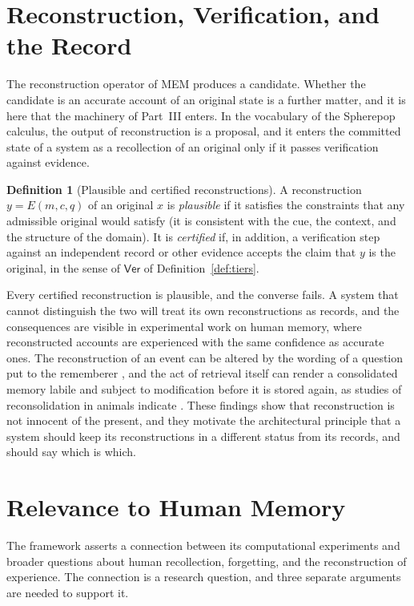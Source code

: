 \documentclass[11pt,twoside,openright]{book}
\theoremstyle{plain}
\theoremstyle{definition}
\newtheorem{definition}[theorem]{Definition}
\theoremstyle{remark}
\newcommand{\Ver}{\mathsf{Ver}}
\newcommand{\memeight}{\mbox{MEM\textbar 8}}
\begin{document}
\section{Reconstruction, Verification, and the Record}

The reconstruction operator of \memeight{} produces a candidate. Whether the candidate is an accurate account of an original state is a further matter, and it is here that the machinery of Part~III enters. In the vocabulary of the Spherepop calculus, the output of reconstruction is a proposal, and it enters the committed state of a system as a recollection of an original only if it passes verification against evidence.

\begin{definition}[Plausible and certified reconstructions]\label{def:certified}
A reconstruction $y=E(m,c,q)$ of an original $x$ is \emph{plausible} if it satisfies the constraints that any admissible original would satisfy (it is consistent with the cue, the context, and the structure of the domain). It is \emph{certified} if, in addition, a verification step against an independent record or other evidence accepts the claim that $y$ is the original, in the sense of $\Ver$ of Definition~\ref{def:tiers}.
\end{definition}

Every certified reconstruction is plausible, and the converse fails. A system that cannot distinguish the two will treat its own reconstructions as records, and the consequences are visible in experimental work on human memory, where reconstructed accounts are experienced with the same confidence as accurate ones. The reconstruction of an event can be altered by the wording of a question put to the rememberer \cite{loftus1974}, and the act of retrieval itself can render a consolidated memory labile and subject to modification before it is stored again, as studies of reconsolidation in animals indicate \cite{nader2000}. These findings show that reconstruction is not innocent of the present, and they motivate the architectural principle that a system should keep its reconstructions in a different status from its records, and should say which is which.

\section{Relevance to Human Memory}

The framework asserts a connection between its computational experiments and broader questions about human recollection, forgetting, and the reconstruction of experience. The connection is a research question, and three separate arguments are needed to support it.
\end{document}
